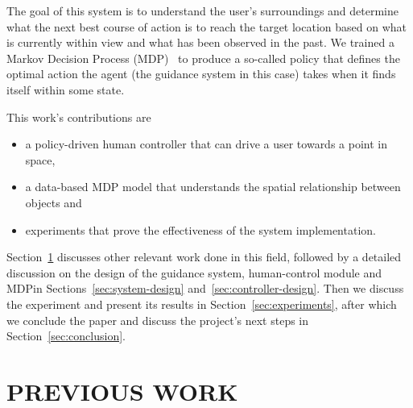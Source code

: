 \documentclass[a4paper, twoside]{article}
\begin{document}
The goal of this system is to understand the user's surroundings and determine what the next best course of action is to reach the target location based on what is currently within view and what has been observed in the past. We trained a Markov Decision Process (MDP)~\cite{bellman1957markovian} to produce a so-called policy that defines the optimal action the agent (the guidance system in this case) takes when it finds itself within some state.  

This work's contributions are 

\begin{itemize}
  \item a policy-driven human controller that can drive a user towards a point in space,
  \item a data-based MDP model that understands the spatial relationship between objects and
  \item experiments that prove the effectiveness of the system implementation.
\end{itemize}


Section~\ref{sec:previous-work} discusses other relevant work done in this field, followed by a detailed discussion on the design of the guidance system, human-control module and MDP\@ in Sections~\ref{sec:system-design} and~\ref{sec:controller-design}. Then we discuss the experiment and present its results in Section~\ref{sec:experiments}, after which we conclude the paper and discuss the project's next steps in Section~\ref{sec:conclusion}. 

\section{\uppercase{Previous Work}}\label{sec:previous-work}
\end{document}
